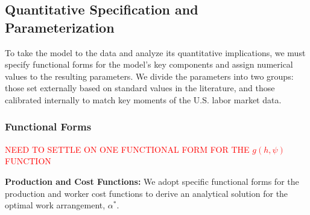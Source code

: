 \documentclass[
  11pt,
  letterpaper,
  DIV=11,
  numbers=noendperiod]{scrartcl}
\begin{document}
\subsection{Quantitative Specification and
Parameterization}\label{quantitative-specification-and-parameterization}

To take the model to the data and analyze its quantitative implications,
we must specify functional forms for the model's key components and
assign numerical values to the resulting parameters. We divide the
parameters into two groups: those set externally based on standard
values in the literature, and those calibrated internally to match key
moments of the U.S. labor market data.

\subsubsection{Functional Forms}\label{functional-forms}

\textcolor{red}{NEED TO SETTLE ON ONE FUNCTIONAL FORM FOR THE $g(h, \psi)$ FUNCTION}

\textbf{Production and Cost Functions:} We adopt specific functional
forms for the production and worker cost functions to derive an
analytical solution for the optimal work arrangement, \(\alpha^*\).
\end{document}
